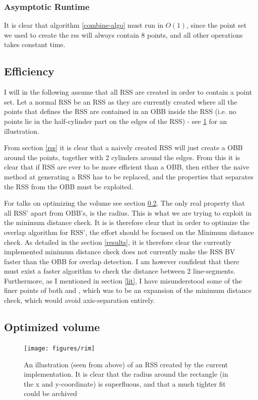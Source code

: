 \subsubsection{Asymptotic Runtime}
It is clear that algorithm \ref{combine-algo} must run in $O(1)$, since the point set we used to create the rss will always contain 8 points, and all other operations takes constant time. 

\subsection{Efficiency}
I will in the following assume that all RSS are created in order to contain a point set. Let a normal RSS be an RSS as they are currently created where all the points that defines the RSS are contained in an OBB inside the RSS (i.e. no points lie in the half-cylinder part on the edges of the RSS) - see \ref{rim} for an illustration. 

From section \ref{rss} it is clear that a naively created RSS will just create a OBB around the points, together with 2 cylinders around the edges. From this it is clear that if RSS are ever to be more efficient than a OBB, then either the naive method at generating a RSS has to be replaced, and the properties that separates the RSS from the OBB must be exploited. 

For talks on optimizing the volume see section \ref{optimized-volume}. The only real property that all RSS' apart from OBB's, is the radius. This is what we are trying to exploit in the minimum distance check. It is is therefore clear that in order to optimize the overlap algorithm for RSS', the effort should be focused on the Minimum distance check. As detailed in the section \ref{results}, it is therefore clear the currently implemented minimum distance check does not currently make the RSS BV faster than the OBB for overlap detection. I am however confident that there must exist a faster algorithm to check the distance between 2 line-segments. 
Furthermore, as I mentioned in section \ref{lit}, I have misunderstood some of the finer points of both \cite{Larsen99fastproximity} and \cite{larsen00fast}, which was to be an expansion of the minimum distance check, which would avoid axis-separation entirely. 

\subsection{Optimized volume}
\label{optimized-volume}
\begin{figure}
\centering
\texttt{[image: figures/rim]}
\caption{\label{rim} An illustration (seen from above) of an RSS created by the current implementation. It is clear that the radius around the rectangle (in the x and y-coordinate) is superfluous, and that a much tighter fit could be archived}
\end{figure}

